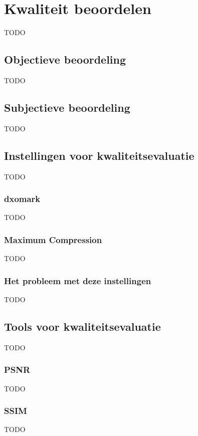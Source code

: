 \chapter{Kwaliteit beoordelen}
\label{ch:kwaliteit}

TODO

\section{Objectieve beoordeling}
\label{sec:kwaliteit-objectief}

TODO

\section{Subjectieve beoordeling}
\label{sec:kwaliteit-subjectief}

TODO

\section{Instellingen voor kwaliteitsevaluatie}
\label{sec:kwaliteit-bedrijven}

TODO

\subsection{dxomark}
\label{sec:kwaliteit-dxomark}

TODO

\subsection{Maximum Compression}
\label{sec:kwaliteit-maximum-compression}

TODO

\subsection{Het probleem met deze instellingen}
\label{sec:kwaliteit-maximum-probleem}

TODO

\section{Tools voor kwaliteitsevaluatie}
\label{sec:kwaliteit-bedrijven}

TODO

\subsection{PSNR}
\label{sec:kwaliteit-psnr}

TODO

\subsection{SSIM}
\label{sec:kwaliteit-ssim}

TODO
